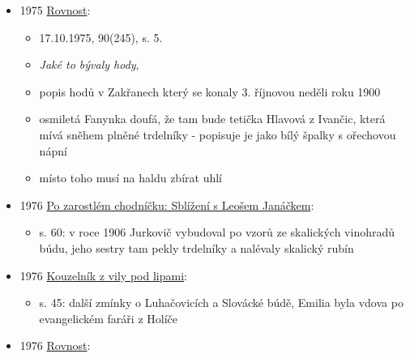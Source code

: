 \begin{itemize}
  \begin{itemize}
  \tightlist
  \item
    s. 7, družba, Hodonín a 
  \item
    navzájem se pohostili sladkostma, ženy ze Senice napekly Skalické
    trdelníky
  \end{itemize}
\item
  1975
  \href{https://ceskadigitalniknihovna.cz/view/uuid:b23f9410-20b3-11ee-a8bd-005056827e51?page=uuid\%3A00d297d0-20cd-11ee-9137-005056822549&fulltext=trdeln\%C3\%ADk\%20OR\%20trdeln\%C3\%ADky\%20OR\%20trdeln\%C3\%ADk\%C5\%AF&source=mzk}{Rovnost}:

  \begin{itemize}
  \tightlist
  \item
    17.10.1975, 90(245), s. 5.
  \item
    \emph{Jaké to bývaly hody}, 
  \item
    popis hodů v Zakřanech  který se konaly
    3. říjnovou neděli roku 1900
  \item
    osmiletá Fanynka doufá, že tam bude tetička Hlavová z Ivančic, která
    mívá sněhem plněné trdelníky - popisuje je jako bílý špalky s
    ořechovou nápní
  \item
    místo toho musí na haldu zbírat uhlí
  \end{itemize}
\item
  1976
  \href{https://ceskadigitalniknihovna.cz/uuid/uuid:16272350-bc77-11e2-b6da-005056827e52}{Po
  zarostlém chodníčku: Sblížení s Leošem Janáčkem}:

  \begin{itemize}
  \tightlist
  \item
    s. 60: v roce 1906 Jurkovič vybudoval po vzorů ze skalických
    vinohradů búdu, jeho sestry tam pekly trdelníky a nalévaly skalický
    rubín
  \end{itemize}
\item
  1976
  \href{https://www.digitalniknihovna.cz/mzk/uuid/uuid:b68ca680-236b-11e2-8579-005056827e52}{Kouzelník
  z vily pod lipami}:

  \begin{itemize}
  \tightlist
  \item
    s. 45: další zmínky o Luhačovicích a Slovácké búdě, Emilia byla
    vdova po evangelickém faráři z Holíče
  \end{itemize}
\item
  1976
  \href{https://ndk.cz/uuid/uuid:c28d9bc0-d57e-11ee-8ea1-5ef3fc9bb22f}{Rovnost}:


\end{itemize}
